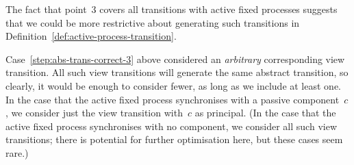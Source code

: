 \begin{impNote}
The fact that point~3 covers all transitions with active fixed
  processes suggests that we could be more restrictive about generating such
  transitions in Definition~\ref{def:active-process-transition}.
\end{impNote}


\begin{opt}
Case~\ref{step:abs-trans-correct-3} above considered an \emph{arbitrary}
corresponding view transition.  All such view transitions will generate the
same abstract transition, so clearly, it would be enough to consider fewer, as
long as we include at least one.  In the case that the active fixed process
synchronises with a passive component~$c$, we consider just the view
transition with~$c$ as principal.  (In the case that the active fixed process
synchronises with no component, we consider all such view transitions; there
is potential for further optimisation here, but these cases seem rare.)
\end{opt}










